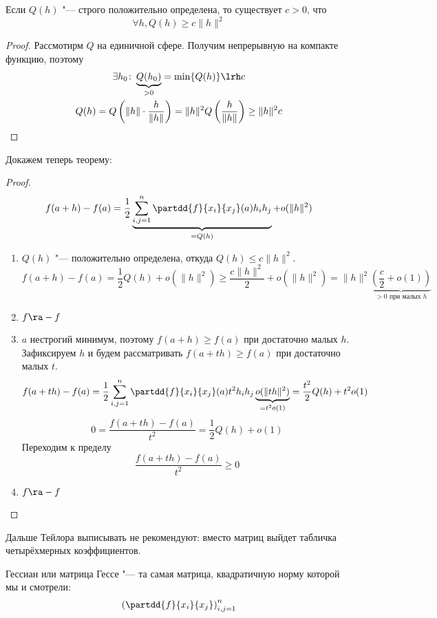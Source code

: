 
\begin{lemma}
	Если $Q(h)$ "--- строго положительно определена, то существует $c > 0$, что
	\[ \forall h, Q(h) \ge c\|h\|^2 \]
\end{lemma}
\begin{proof}
	Рассмотирм $Q$ на единичной сфере. Получим непрерывную на компакте функцию, поэтому
	\begin{gather*}
		\exists h_0\colon \underbrace{Q(h_0)}_{>0} = \min \{Q(h)\} \lrh c \\
		Q(h) = Q\left(\|h\| \cdot \frac{h}{\|h\|}\right) = \|h\|^2 Q\left(\frac{h}{\|h\|}\right) \ge \|h\|^2 c
	\end{gather*}
\end{proof}

Докажем теперь теорему:
\begin{proof}
	\[ f(a + h) - f(a) = \frac12 \underbrace{\sum_{i,j = 1}^n \partdd{f}{x_i}{x_j}(a) h_ih_j}_{=Q(h)} + o(\|h\|^2) \]
	\begin{enumerate}
	\item
		$Q(h)$ "--- положительно определена, откуда $Q(h) \le c \|h\|^2$.
		\[  f(a+h) - f(a) = \frac12 Q(h) + o(\|h\|^2) \ge \frac{c\|h\|^2}2 + o(\|h\|^2) = \|h\|^2 \underbrace{\left(\frac{c}2 + o(1)\right)}_{\text{$>0$ при малых $h$}} \]

	\item $f \ra -f$

	\item
		$a$ нестрогий минимум, поэтому $f(a+h) \ge f(a)$ при достаточно малых $h$.
		Зафиксируем $h$ и будем рассматривать $f(a+th) \ge f(a)$ при достаточно малых $t$.
		\[ f(a+th) - f(a) = \frac12 \sum_{i,j = 1}^n \partdd{f}{x_i}{x_j}(a) t^2h_ih_j \underbrace{o(\|th\|^2)}_{=t^2o(1)} = \frac{t^2}2 Q(h) + t^2o(1)\]
		\[ 0 = \frac{f(a+th) - f(a)}{t^2} = \frac12 Q(h) + o(1) \]
		Переходим к пределу
		\[ \frac{f(a+th) - f(a)}{t^2} \ge 0 \]

	\item $f \ra -f$
	\end{enumerate}
\end{proof}

Дальше Тейлора выписывать не рекомендуют: вместо матриц выйдет табличка четырёхмерных коэффициентов.

\begin{Def}
	Гессиан или матрица Гессе "--- та самая матрица, квадратичную норму которой мы и смотрели:
	\[ \left( \partdd{f}{x_i}{x_j}\right)_{i,j=1}^n \]
\end{Def}

